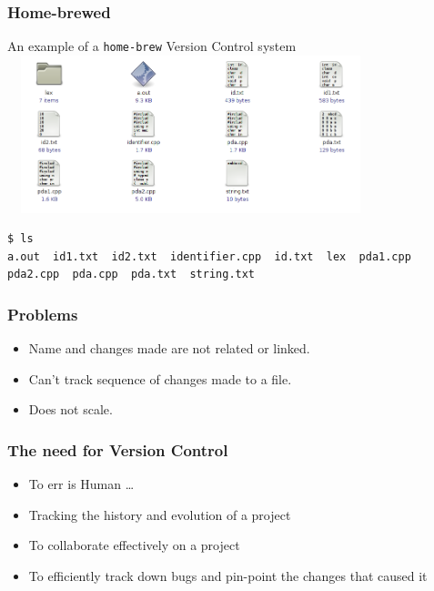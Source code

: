 \documentclass[14pt,compress]{beamer}
\newcommand{\typ}[1]{\lstinline{#1}}
\begin{document}
\begin{frame}[fragile]
  \frametitle{Home-brewed}
  \begin{center}
    An example of a \typ{home-brew} Version Control system
    \includegraphics[height=1.8in,width=4.2in]{images/folder.png}
  \end{center}
  \begin{lstlisting} 
$ ls
a.out  id1.txt  id2.txt  identifier.cpp  id.txt  lex  pda1.cpp  pda2.cpp  pda.cpp  pda.txt  string.txt
  \end{lstlisting} %
\end{frame}

\begin{frame}[fragile]
  \frametitle{Problems}  
  \begin{block}{}    
  \begin{itemize}
  \item Name and changes made are not related or linked. 
  \item Can't track sequence of changes made to a file. 
  \item Does not scale. 
  \end{itemize}
    \end{block}
\end{frame}

\begin{frame}[fragile]
  \frametitle{The need for Version Control}
  \begin{itemize}
  \item \alert{To err is Human} \ldots 
  \item Tracking the history and evolution of a project
  \item To collaborate effectively on a project
  \item To efficiently track down bugs and pin-point the changes that
    caused it 
  \end{itemize}
\end{frame}
\end{document}
